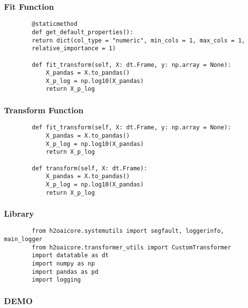 \documentclass[11pt,
               aspectratio=169,
               hyperref={colorlinks}
               ]{beamer}
\begin{document}
	\begin{frame}[fragile]
		\frametitle{Fit Function}
		\begin{verbatim}
		@staticmethod
		def get_default_properties():
		return dict(col_type = "numeric", min_cols = 1, max_cols = 1,
		relative_importance = 1)

		def fit_transform(self, X: dt.Frame, y: np.array = None):
			X_pandas = X.to_pandas()
			X_p_log = np.log10(X_pandas)
			return X_p_log
		\end{verbatim}
\end{frame}
	\begin{frame}[fragile]
		\frametitle{Transform Function}
		\begin{verbatim}
		def fit_transform(self, X: dt.Frame, y: np.array = None):
			X_pandas = X.to_pandas()
			X_p_log = np.log10(X_pandas)
			return X_p_log

		def transform(self, X: dt.Frame):
			X_pandas = X.to_pandas()
			X_p_log = np.log10(X_pandas)
			return X_p_log
		\end{verbatim}
\end{frame}
	\begin{frame}[fragile]
		\frametitle{Library}
		\begin{verbatim}
		from h2oaicore.systemutils import segfault, loggerinfo, main_logger
		from h2oaicore.transformer_utils import CustomTransformer
		import datatable as dt
		import numpy as np
		import pandas as pd
		import logging
		\end{verbatim}
\end{frame}
	\begin{frame}
		\frametitle{DEMO}
	\end{frame}
\end{document}
